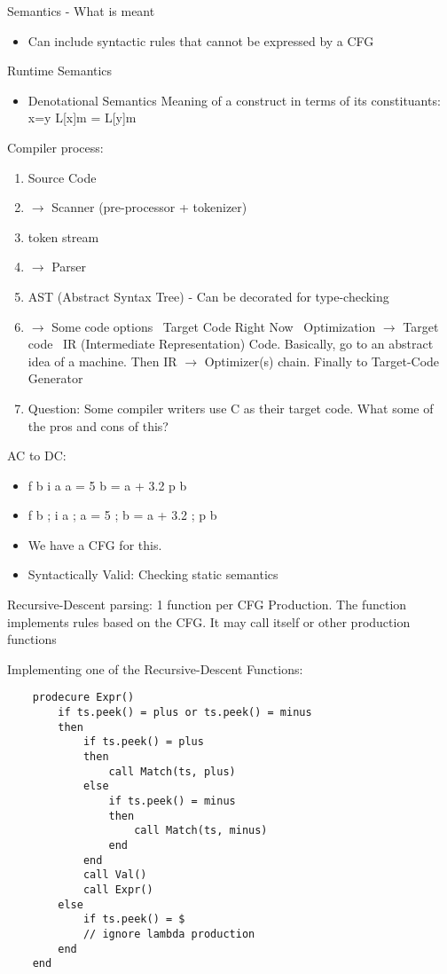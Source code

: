 \documentclass[11pt]{article}
\begin{document}
    Semantics - What is meant
    \begin{itemize}
        \item Can include syntactic rules that cannot be expressed by a CFG
    \end{itemize}

    Runtime Semantics
    \begin{itemize}
        \item Denotational Semantics
            Meaning of a construct in terms of its constituants: x=y    L[x]m = L[y]m
    \end{itemize}

    Compiler process:
    \begin{enumerate}
        \item Source Code
        \item $\rightarrow$ Scanner (pre-processor + tokenizer)
        \item token stream
        \item $\rightarrow$ Parser
        \item AST (Abstract Syntax Tree) - Can be decorated for type-checking
        \item $\rightarrow$ Some code options \
            Target Code Right Now \
            Optimization $\rightarrow$ Target code \
            IR (Intermediate Representation) Code. Basically, go to an abstract idea of a machine.
            Then IR $\rightarrow$ Optimizer(s) chain.
            Finally to Target-Code Generator
        \item Question: Some compiler writers use C as their target code. What some of the pros and cons of this?
    \end{enumerate}

    AC to DC:
    \begin{itemize}
        \item f b i a a = 5 b = a + 3.2 p b
        \item f b ; i a ; a = 5 ; b = a + 3.2 ; p b
        \item We have a CFG for this.
        \item Syntactically Valid: Checking static semantics
    \end{itemize}

    Recursive-Descent parsing: 1 function per CFG Production. The function implements rules based on the CFG. It may call itself or other production functions

    Implementing one of the Recursive-Descent Functions:
    \begin{verbatim}
    prodecure Expr()
        if ts.peek() = plus or ts.peek() = minus
        then
            if ts.peek() = plus
            then
                call Match(ts, plus)
            else
                if ts.peek() = minus
                then
                    call Match(ts, minus)
                end
            end
            call Val()
            call Expr()
        else
            if ts.peek() = $
            // ignore lambda production
        end
    end
    \end{verbatim}
\end{document}
